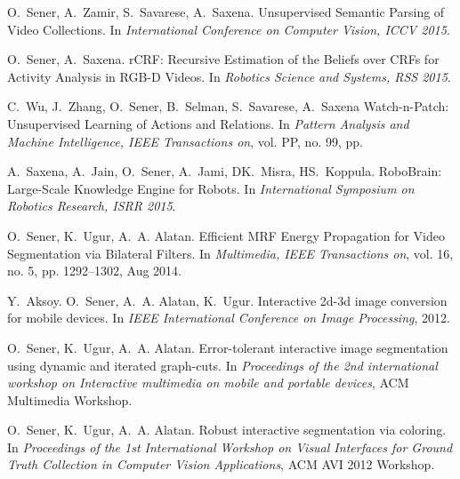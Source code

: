 O.~Sener, A.~Zamir, S.~Savarese, A.~Saxena.
\newblock Unsupervised Semantic Parsing of Video Collections.
\newblock In {\em International Conference on Computer Vision, ICCV 2015}.
\vspace{-2mm}

O.~Sener, A.~Saxena.
\newblock rCRF: Recursive Estimation of the Beliefs over CRFs for Activity Analysis in RGB-D Videos.
\newblock In {\em Robotics Science and Systems, RSS 2015}.
\vspace{-2mm}


C.~Wu, J.~Zhang, O.~Sener, B.~Selman, S.~Savarese, A.~Saxena
\newblock Watch-n-Patch: Unsupervised Learning of Actions and Relations.
\newblock In {\em Pattern Analysis and Machine Intelligence, IEEE Transactions on}, vol. PP, no. 99, pp.


A.~Saxena, A.~Jain, O.~Sener, A.~Jami, DK.~Misra, HS.~Koppula.
\newblock RoboBrain: Large-Scale Knowledge Engine for Robots.
\newblock In {\em International Symposium on Robotics Research, ISRR 2015}.
\vspace{-2mm}

O.~Sener, K.~Ugur, A.~A. Alatan.
\newblock Efficient MRF Energy Propagation for Video Segmentation via Bilateral Filters.
\newblock In {\em Multimedia, IEEE Transactions on}, vol. 16, no. 5, pp. 1292–1302, Aug 2014.


Y.~Aksoy. O.~Sener, A.~A. Alatan, K.~Ugur.
\newblock Interactive 2d-3d image conversion for mobile devices.
\newblock In {\em IEEE International Conference on Image Processing}, 2012.
\vspace{-2mm}

\ifx\alltyperesume\undefined
\else
\newpage
\fi

O.~Sener, K.~Ugur, A.~A. Alatan.
\newblock Error-tolerant interactive image segmentation using dynamic and iterated graph-cuts.
\newblock In {\em Proceedings of the 2nd international workshop on Interactive multimedia on mobile and portable devices}, ACM Multimedia Workshop.

O.~Sener, K.~Ugur, A.~A. Alatan.
\newblock Robust interactive segmentation via coloring.
\newblock In {\em Proceedings of the 1st International Workshop on Visual
Interfaces for Ground Truth Collection in Computer Vision Applications},
ACM AVI 2012 Workshop.